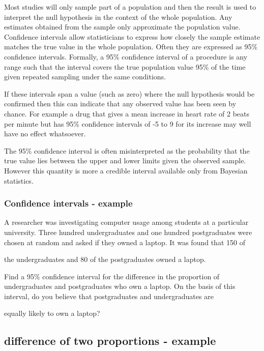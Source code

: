  

Most studies will only sample part of a population and then the result is used to interpret the null hypothesis in the context of the whole population. Any estimates obtained from the sample only approximate the population value. Confidence intervals allow statisticians to express how closely the sample estimate matches the true value in the whole population. Often they are expressed as 95\% confidence intervals. Formally, a 95\% confidence interval of a procedure is any range such that the interval covers the true population value 95\% of the time given repeated sampling under the same conditions.

 

If these intervals span a value (such as zero) where the null hypothesis would be confirmed then this can indicate that any observed value has been seen by chance. For example a drug that gives a mean increase in heart rate of 2 beats per minute but has 95\% confidence intervals of -5 to 9 for its increase may well have no effect whatsoever.

 

The 95\% confidence interval is often misinterpreted as the probability that the true value lies between the upper and lower limits given the observed sample. However this quantity is more a credible interval available only from Bayesian statistics.

 

\subsubsection{Confidence intervals - example}

A researcher was investigating computer usage among students at a particular university. Three hundred undergraduates and one hundred postgraduates were chosen at random and asked if they owned a laptop. It was found that 150 of

the undergraduates and 80 of the postgraduates owned a laptop.

 

Find a 95\% confidence interval for the difference in the proportion of undergraduates and postgraduates who own a laptop. On the basis of this interval, do you believe that postgraduates and undergraduates are

equally likely to own a laptop?

 

\subsection{difference of two proportions - example}

